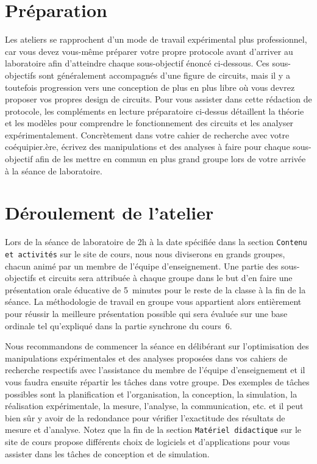 \documentclass[canadien,12pt,oneside,letterpaper]{article}
\begin{document}
\vspace{-3ex}
\section{Préparation}
\vspace{-1.5ex}
\setlength{\parskip}{1ex plus 0.5ex minus 0.2ex}
Les ateliers se rapprochent d'un mode de travail expérimental plus professionnel, car vous devez vous-même préparer votre propre protocole avant d'arriver au laboratoire afin d'atteindre chaque sous-objectif énoncé ci-dessous. Ces sous-objectifs sont généralement accompagnés d'une figure de circuits, mais il y a toutefois progression vers une conception de plus en plus libre où vous devrez proposer vos propres design de circuits. Pour vous assister dans cette rédaction de protocole, les compléments en lecture préparatoire ci-dessus détaillent la théorie et les modèles pour comprendre le fonctionnement des circuits et les analyser expérimentalement. Concrètement dans votre cahier de recherche avec votre coéquipier.ère, écrivez des manipulations et des analyses à faire pour chaque sous-objectif afin de les mettre en commun en plus grand groupe lors de votre arrivée à la séance de laboratoire. 

\vspace{-3ex}
\section{Déroulement de l’atelier}
\vspace{-1.5ex}
Lors de la séance de laboratoire de 2h à la date spécifiée dans la section \texttt{Contenu et activités} sur le site de cours, nous nous diviserons en grands groupes, chacun animé par un membre de l’équipe d’enseignement. Une partie des sous-objectifs et circuits sera attribuée à chaque groupe dans le but d'en faire une présentation orale éducative de 5~minutes pour le reste de la classe à la fin de la séance. La méthodologie de travail en groupe vous appartient alors entièrement pour réussir la meilleure présentation possible qui sera évaluée sur une base ordinale tel qu'expliqué dans la partie synchrone du cours~6.

Nous recommandons de commencer la séance en délibérant sur l'optimisation des manipulations expérimentales et des analyses proposées dans vos cahiers de recherche respectifs avec l'assistance du membre de l'équipe d'enseignement et il vous faudra ensuite répartir les tâches dans votre groupe. Des exemples de tâches possibles sont la planification et l'organisation, la conception, la simulation, la réalisation expérimentale, la mesure, l'analyse, la communication, etc. et il peut bien sûr y avoir de la redondance pour vérifier l'exactitude des résultats de mesure et d'analyse. Notez que la fin de la section \texttt{Matériel didactique} sur le site de cours propose différents choix de logiciels et d'applications pour vous assister dans les tâches de conception et de simulation.
\end{document}
